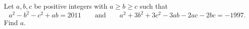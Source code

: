 Let $a,b,c$ be positive integers with $a\ge b\ge c$ such that
\[a^2-b^2-c^2+ab=2011\qquad\text{and}\qquad a^2+3b^2+3c^2-3ab-2ac-2bc=-1997 .\]
Find $a$.
